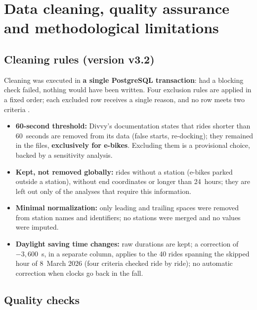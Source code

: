 \section{Data cleaning, quality assurance and methodological limitations}
\label{sec:cleaning}

\subsection{Cleaning rules (version v3.2)}

Cleaning was executed in \textbf{a single PostgreSQL transaction}: had a blocking check failed, nothing would have been written.
Four exclusion rules are applied in a fixed order; each excluded row receives a single reason, and no row meets two criteria \Mes.

\begin{table}[H]
\caption{Row reconciliation: from raw data to analyzed rides}
\label{tab:cascade}
\small

\par{}
\end{table}

\begin{itemize}
  \item \textbf{60-second threshold:} Divvy's documentation states that rides shorter than 60~seconds are removed from its data (false starts, re-docking); they remained in the files, \textbf{exclusively for e-bikes}. Excluding them is a provisional choice, backed by a sensitivity analysis.
  \item \textbf{Kept, not removed globally:} rides without a station (e-bikes parked outside a station), without end coordinates or longer than 24~hours; they are left out only of the analyses that require this information.
  \item \textbf{Minimal normalization:} only leading and trailing spaces were removed from station names and identifiers; no stations were merged and no values were imputed.
  \item \textbf{Daylight saving time changes:} raw durations are kept; a correction of $-3{,}600$~s, in a separate column, applies to the 40 rides spanning the skipped hour of 8~March 2026 (four criteria checked ride by ride); no automatic correction when clocks go back in the fall.
\end{itemize}

\subsection{Quality checks}

